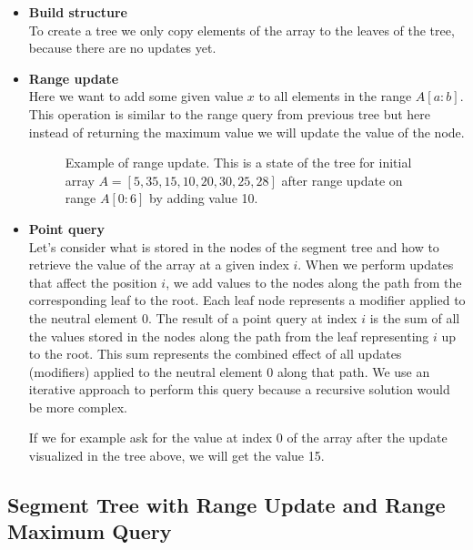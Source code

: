 \documentclass[11pt]{article}
\begin{document}
\begin{itemize}
    \item \textbf{Build structure} \\
    To create a tree we only copy elements of the array to the leaves of the tree, 
    because there are no updates yet.
    \FloatBarrier
    \item \textbf{Range update} \\
    Here we want to add some given value $x$ to all elements in the range $A[a:b]$.
    This operation is similar to the range query from previous tree but here instead of
    returning the maximum value we will update the value of the node.
    
    \begin{figure}[H]
        \centering
        
        \caption{Example of range update. This is a state of the tree for initial array $A = [5, 35, 15, 10, 20, 30, 25, 28]$ after range update on range $A[0:6]$ by adding value 10.}
    \end{figure}

    \item \textbf{Point query} \\
    Let's consider what is stored in the nodes of the segment tree and how to retrieve the value of the array at a given index \( i \).
    When we perform updates that affect the position \( i \), we add values to the nodes along the path from the corresponding leaf to the root. Each leaf node represents a modifier applied to the neutral element \( 0 \).
    The result of a point query at index \( i \) is the sum of all the values stored in the nodes along the path from the leaf representing \( i \) up to the root. This sum represents the combined effect of all updates (modifiers) applied to the neutral element \( 0 \) along that path.
    We use an iterative approach to perform this query because a recursive solution would be more complex.
    

    If we for example ask for the value at index 0 of the array after the update visualized in
    the tree above, we will get the value 15. \\
\end{itemize}

\subsection{Segment Tree with Range Update and Range Maximum Query}
\end{document}
